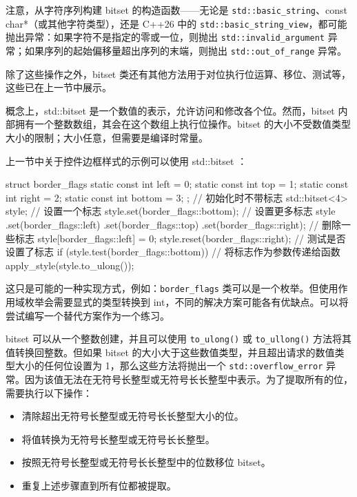 注意，从字符序列构建 bitset 的构造函数——无论是 \verb|std::basic_string|、const char*（或其他字符类型），还是 C++26 中的 \verb|std::basic_string_view|，都可能抛出异常：如果字符不是指定的零或一位，则抛出 \verb|std::invalid_argument| 异常；如果序列的起始偏移量超出序列的末端，则抛出 \verb|std::out_of_range| 异常。

除了这些操作之外，bitset 类还有其他方法用于对位执行位运算、移位、测试等，这些已在上一节中展示。

概念上，std::bitset 是一个数值的表示，允许访问和修改各个位。然而，bitset 内部拥有一个整数数组，其会在这个数组上执行位操作。bitset 的大小不受数值类型大小的限制；大小任意，但需要是编译时常量。

上一节中关于控件边框样式的示例可以使用 std::bitset ：

\begin{cpp}
struct border_flags
{
    static const int left = 0;
    static const int top = 1;
    static const int right = 2;
    static const int bottom = 3;
};
// 初始化时不带标志
std::bitset<4> style;
// 设置一个标志
style.set(border_flags::bottom);
// 设置更多标志
style
    .set(border_flags::left)
    .set(border_flags::top)
    .set(border_flags::right);
// 删除一些标志
style[border_flags::left] = 0;
style.reset(border_flags::right);
// 测试是否设置了标志
if (style.test(border_flags::bottom)) {}
// 将标志作为参数传递给函数
apply_style(style.to_ulong());
\end{cpp}

这只是可能的一种实现方式，例如：\verb|border_flags| 类可以是一个枚举。但使用作用域枚举会需要显式的类型转换到 int，不同的解决方案可能各有优缺点。可以将尝试编写一个替代方案作为一个练习。


bitset 可以从一个整数创建，并且可以使用 \verb|to_ulong()| 或 \verb|to_ullong()| 方法将其值转换回整数。但如果 bitset 的大小大于这些数值类型，并且超出请求的数值类型大小的任何位设置为 1，那么这些方法将抛出一个 \verb|std::overflow_error| 异常。因为该值无法在无符号长整型或无符号长长整型中表示。为了提取所有的位，需要执行以下操作：

\begin{itemize}
\item
清除超出无符号长整型或无符号长长整型大小的位。

\item
将值转换为无符号长整型或无符号长长整型。

\item
按照无符号长整型或无符号长长整型中的位数移位 bitset。

\item
重复上述步骤直到所有位都被提取。
\end{itemize}

